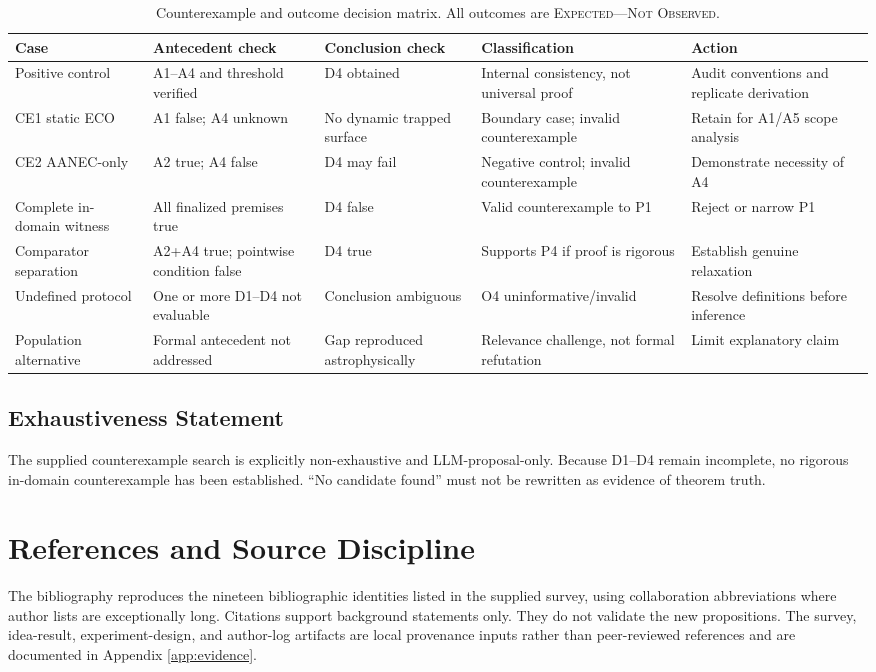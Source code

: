 \documentclass[conference]{IEEEtran}
\newcommand{\Expected}{\textsc{Expected---Not Observed}}
\begin{document}
\begin{table}[t]
\caption{Counterexample and outcome decision matrix. All outcomes are \Expected.}
\label{tab:counterexamples}
\centering
\scriptsize
\setlength{\tabcolsep}{3pt}
\begin{tabular}{p{}p{}p{}p{}p{}}
\toprule
\textbf{Case} & \textbf{Antecedent check} & \textbf{Conclusion check} & \textbf{Classification} & \textbf{Action}\\
\midrule
Positive control & A1--A4 and threshold verified & D4 obtained & Internal consistency, not universal proof & Audit conventions and replicate derivation\\
CE1 static ECO & A1 false; A4 unknown & No dynamic trapped surface & Boundary case; invalid counterexample & Retain for A1/A5 scope analysis\\
CE2 AANEC-only & A2 true; A4 false & D4 may fail & Negative control; invalid counterexample & Demonstrate necessity of A4\\
Complete in-domain witness & All finalized premises true & D4 false & Valid counterexample to P1 & Reject or narrow P1\\
Comparator separation & A2+A4 true; pointwise condition false & D4 true & Supports P4 if proof is rigorous & Establish genuine relaxation\\
Undefined protocol & One or more D1--D4 not evaluable & Conclusion ambiguous & O4 uninformative/invalid & Resolve definitions before inference\\
Population alternative & Formal antecedent not addressed & Gap reproduced astrophysically & Relevance challenge, not formal refutation & Limit explanatory claim\\
\bottomrule
\end{tabular}
\end{table}

\subsection{Exhaustiveness Statement}
The supplied counterexample search is explicitly non-exhaustive and LLM-proposal-only. Because D1--D4 remain incomplete, no rigorous in-domain counterexample has been established. ``No candidate found'' must not be rewritten as evidence of theorem truth.

\section{References and Source Discipline}
\label{sec:references}
The bibliography reproduces the nineteen bibliographic identities listed in the supplied survey, using collaboration abbreviations where author lists are exceptionally long. Citations support background statements only. They do not validate the new propositions. The survey, idea-result, experiment-design, and author-log artifacts are local provenance inputs rather than peer-reviewed references and are documented in Appendix \ref{app:evidence}.
\end{document}

